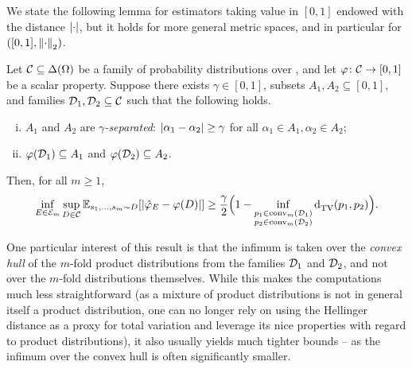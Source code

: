 \documentclass[11pt]{article}
\begin{document}
We state the following lemma for estimators taking value in $[0,1]$ endowed with the distance $\left\lvert \cdot \right\rvert$, but it holds for more general metric spaces, and in particular for $([0,1], {\lVert\cdot{\rVert}}_2)$.
\begin{theorem}\label{theo:lecam:method}
  Let $\mathcal{C}\subseteq\Delta\!\left(\Omega\right)$ be a family of probability distributions over \domain, and let $\varphi\colon\mathcal{C}\to[0,1]$ be a scalar property. 
  Suppose there exists $\gamma \in [0,1]$, subsets $A_1,A_2\subseteq[0,1]$, and families $\mathcal{D}_1,\mathcal{D}_2\subseteq\mathcal{C}$ such that the following holds.
  \begin{enumerate}[(i)]
    \item\label{eq:lecam:condition:1} $A_1$ and $A_2$ are \emph{$\gamma$-separated}: $\left\lvert \alpha_1-\alpha_2 \right\rvert \geq \gamma$ for all $\alpha_1\in A_1, \alpha_2\in A_2$;
    \item\label{eq:lecam:condition:2} $\varphi(\mathcal{D}_1) \subseteq A_1$ and $\varphi(\mathcal{D}_2) \subseteq A_2$.
  \end{enumerate}
  Then, for all $m\geq 1$,
  \begin{equation}\label{eq:lecam:conclusion}
    \inf_{E\in \mathcal{E}_m} \sup_{D\in\mathcal{C} } \mathbb{E}_{s_1,\dots,s_m\sim D}\!\left[ \left\lvert \hat{\varphi}_E - \varphi(D) \right\rvert \right] 
    \geq \frac{\gamma}{2}\Big(1-\inf_{\substack{ p_1 \in \operatorname{conv}_m(\mathcal{D}_1) \\ p_2 \in \operatorname{conv}_m(\mathcal{D}_2) }} {\operatorname{d}_{\rm TV}^{}\!\left({p_1, p_2}\right)}\Big).
  \end{equation}
\end{theorem}
One particular interest of this result is that the infimum is taken over the \emph{convex hull} of the $m$-fold product distributions from the families $\mathcal{D}_1$ and $\mathcal{D}_2$, and not over the $m$-fold distributions themselves. While this makes the computations much less straightforward (as a mixture of product distributions is not in general itself a product distribution, one can no longer rely on using the Hellinger distance as a proxy for total variation and leverage its nice properties with regard to product distributions), it also usually yields much tighter bounds -- as the infimum over the convex hull is often significantly smaller.
\end{document}
